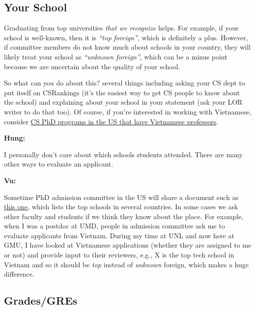 \documentclass[11pt]{article}
\newenvironment{commentbox}[1][]{
\small
    \begin{cbox}
    \textbf{#1} 
 }{
   \end{cbox}
}
\begin{document}
\subsection{Your School}\label{sec:your-school}

Graduating from top universities \emph{that we recognize} helps. For example, if your school is well-known, then it is \emph{``top foreign''}, which is definitely a plus.
However, if committee members do not know much about schools in your country, they will likely treat your school as
\emph{``unknown foreign''}, which can be a minus point because we are uncertain about the quality of your school.

So what can you do about this? several things including asking your CS dept to put itself on CSRankings (it's the easiest way to get CS people to know about the school) and explaining about your school in your statement (ask your LOR writer to do that too). Of course, if you're interested in working with Vietnamese, consider  \href{https://github.com/dynaroars/dynaroars.github.io/wiki/Viet-CS-Profs-US}{CS PhD programs in the US that have Vietnamese professors}.

\begin{commentbox}[Hung:]
I personally don’t care about which schools students attended. There are many other ways to evaluate an applicant.
\end{commentbox}

\begin{commentbox}[Vu:]
Sometime PhD admission committee in the US will share a document such as \href{https://github.com/dynaroars/dynaroars.github.io/wiki/Foreign-Top-Schools}{this one}, which lists the top schools in several countries. In some cases we ask other faculty and students if we think they know about the place.  For example, when I was a postdoc at UMD, people in admission committee ask me to evaluate applicants from Vietnam.  During my time at UNL and now here at GMU, I have looked at Vietnamese applications (whether they are assigned to me or not) and provide input to their reviewers, e.g., X is the top tech school in Vietnam and so it should be \emph{top} instead of \emph{unknown} foreign, which makes a huge difference.
\end{commentbox}



\subsection{Grades/GREs}\label{sec:grades}
\end{document}
